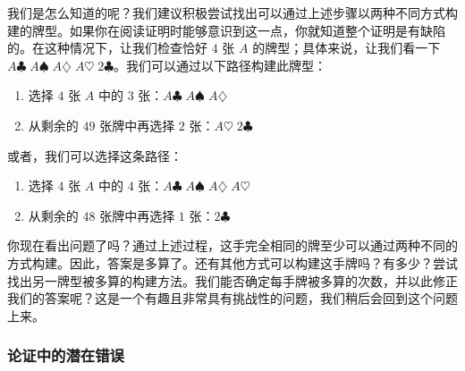 \begin{example}[找出缺陷]
    我们是怎么知道的呢？我们建议积极尝试找出可以通过上述步骤以两种不同方式构建的牌型。如果你在阅读证明时能够意识到这一点，你就知道整个证明是有缺陷的。在这种情况下，让我们检查恰好 $4$ 张 $A$ 的牌型；具体来说，让我们看一下 $A \clubsuit \; A\spadesuit \;A\diamondsuit \;A\heartsuit\;2\clubsuit$。我们可以通过以下路径构建此牌型：
    \begin{enumerate}
        \item 选择 $4$ 张 $A$ 中的 $3$ 张：$A \clubsuit \; A\spadesuit \;A\diamondsuit$
        \item 从剩余的 $49$ 张牌中再选择 $2$ 张：$A\heartsuit\;2\clubsuit$
    \end{enumerate}
    或者，我们可以选择这条路径：
    \begin{enumerate}
        \item 选择 $4$ 张 $A$ 中的 $4$ 张：$A \clubsuit \; A\spadesuit \;A\diamondsuit\;A\heartsuit$
        \item 从剩余的 $48$ 张牌中再选择 $1$ 张：$2\clubsuit$
    \end{enumerate}
    你现在看出问题了吗？通过上述过程，这手完全相同的牌至少可以通过两种不同的方式构建。因此，答案是多算了。还有其他方式可以构建这手牌吗？有多少？尝试找出另一牌型被多算的构建方法。我们能否确定每手牌被多算的次数，并以此修正我们的答案呢？这是一个有趣且非常具有挑战性的问题，我们稍后会回到这个问题上来。
\end{example}

\subsubsection*{论证中的潜在错误}

